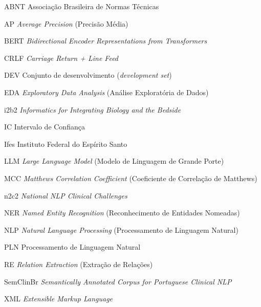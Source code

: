 \begin{siglas}
  \item[ABNT]      Associação Brasileira de Normas Técnicas
  \item[AP]        \textit{Average Precision} (Precisão Média)
  \item[BERT]      \textit{Bidirectional Encoder Representations from Transformers}
  \item[CRLF]      \textit{Carriage Return + Line Feed}
  \item[DEV]       Conjunto de desenvolvimento (\textit{development set})
  \item[EDA]       \textit{Exploratory Data Analysis} (Análise Exploratória de Dados)
  \item[i2b2]      \textit{Informatics for Integrating Biology and the Bedside}
  \item[IC]        Intervalo de Confiança
  \item[Ifes]      Instituto Federal do Espírito Santo
  \item[LLM]       \textit{Large Language Model} (Modelo de Linguagem de Grande Porte)
  \item[MCC]       \textit{Matthews Correlation Coefficient} (Coeficiente de Correlação de Matthews)
  \item[n2c2]      \textit{National NLP Clinical Challenges}
  \item[NER]       \textit{Named Entity Recognition} (Reconhecimento de Entidades Nomeadas)
  \item[NLP]       \textit{Natural Language Processing} (Processamento de Linguagem Natural)
  \item[PLN]       Processamento de Linguagem Natural
  \item[RE]        \textit{Relation Extraction} (Extração de Relações)
  \item[SemClinBr] \textit{Semantically Annotated Corpus for Portuguese Clinical NLP}
  \item[XML]       \textit{Extensible Markup Language}
\end{siglas}

